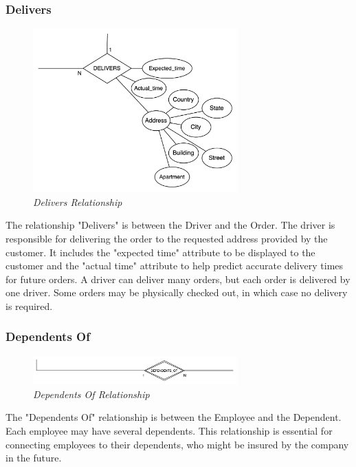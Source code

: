 \documentclass[11pt]{article}
\begin{document}
\subsubsection{Delivers}
\begin{figure}[H]
  \centering
  \includegraphics[width=0.7\textwidth]{images/relationships/delivers.png}
  \caption{\textit{Delivers Relationship}}
\end{figure}

The relationship "Delivers" is between the Driver and the Order. The driver is responsible for delivering the order to the requested address provided by the customer. It includes the "expected time" attribute to be displayed to the customer and the "actual time" attribute to help predict accurate delivery times for future orders. A driver can deliver many orders, but each order is delivered by one driver. Some orders may be physically checked out, in which case no delivery is required.

\subsubsection{Dependents Of}
\begin{figure}[H]
  \centering
  \includegraphics[width=0.7\textwidth]{images/relationships/dependents_of.png}
  \caption{\textit{Dependents Of Relationship}}
\end{figure}

The "Dependents Of" relationship is between the Employee and the Dependent. Each employee may have several dependents. This relationship is essential for connecting employees to their dependents, who might be insured by the company in the future.
\end{document}
